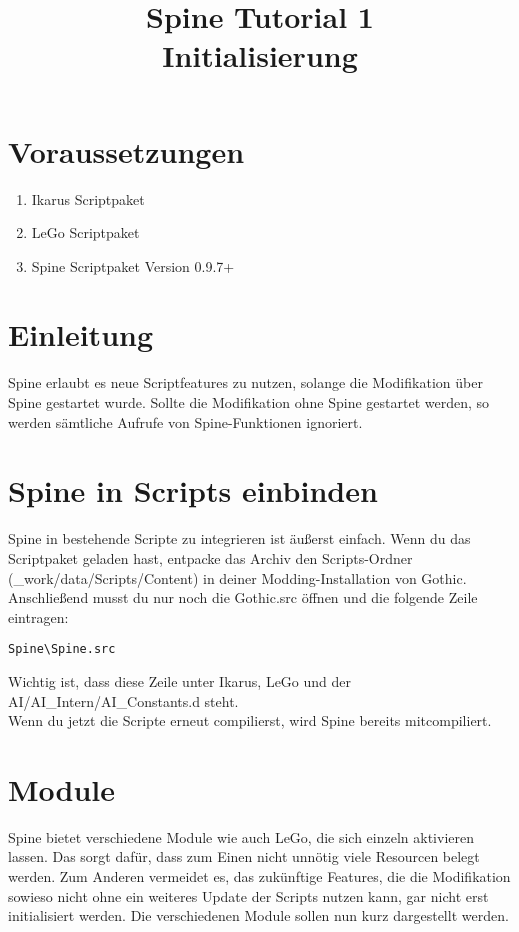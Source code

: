 \documentclass{article}
\title{Spine Tutorial 1 \\ Initialisierung}
\begin{document}
\section{Voraussetzungen}

\begin{enumerate}
\item Ikarus Scriptpaket
\item LeGo Scriptpaket
\item Spine Scriptpaket Version 0.9.7+
\end{enumerate}

\section{Einleitung}

Spine erlaubt es neue Scriptfeatures zu nutzen, solange die Modifikation über Spine gestartet wurde. Sollte die Modifikation ohne Spine gestartet werden, so werden sämtliche Aufrufe von Spine-Funktionen ignoriert.

\section{Spine in Scripts einbinden}

Spine in bestehende Scripte zu integrieren ist äußerst einfach. Wenn du das Scriptpaket geladen hast, entpacke das Archiv den Scripts-Ordner (\_work/data/Scripts/Content) in deiner Modding-Installation von Gothic. Anschließend musst du nur noch die Gothic.src öffnen und die folgende Zeile eintragen:\\

\begin{lstlisting}
Spine\Spine.src
\end{lstlisting}

Wichtig ist, dass diese Zeile unter Ikarus, LeGo und der AI/AI\_Intern/AI\_Constants.d steht.\\
Wenn du jetzt die Scripte erneut compilierst, wird Spine bereits mitcompiliert.

\section{Module}

Spine bietet verschiedene Module wie auch LeGo, die sich einzeln aktivieren lassen. Das sorgt dafür, dass zum Einen nicht unnötig viele Resourcen belegt werden. Zum Anderen vermeidet es, das zukünftige Features, die die Modifikation sowieso nicht ohne ein weiteres Update der Scripts nutzen kann, gar nicht erst initialisiert werden. Die verschiedenen Module sollen nun kurz dargestellt werden.
\end{document}
